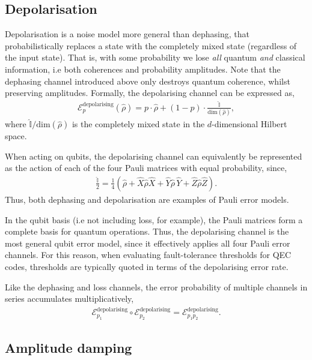 \documentclass[aps,rmp,twocolumn,amsmath,amssymb,nofootinbib,superscriptaddress]{revtex4}
\begin{document}
\subsection{Depolarisation}

Depolarisation is a noise model more general than dephasing, that probabilistically replaces a state with the completely mixed state (regardless of the input state). That is, with some probability we lose \emph{all} quantum \emph{and} classical information, i.e both coherences and probability amplitudes. Note that the dephasing channel introduced above only destroys quantum coherence, whilst preserving amplitudes. Formally, the depolarising channel can be expressed as,
\begin{align} \label{eq:depolarizing_channel}
\mathcal{E}^\mathrm{depolarising}_p(\hat\rho) = p \cdot \hat\rho + (1-p)\cdot \frac{\mathbb{\hat{I}}}{\mathrm{dim}(\hat\rho)},
\end{align}
where $\mathbb{\hat{I}}/\mathrm{dim}(\hat\rho)$ is the completely mixed state in the $d$-dimensional Hilbert space.

When acting on qubits, the depolarising channel can equivalently be represented as the action of each of the four Pauli matrices with equal probability, since,
\begin{align}
\frac{\mathbb{\hat{I}}}{2} = \frac{1}{4}(\hat\rho + \hat{X}\hat\rho\hat{X} + \hat{Y}\hat\rho\,\hat{Y} + \hat{Z}\hat\rho\hat{Z}).
\end{align}
Thus, both dephasing and depolarisation are examples of Pauli error models.

In the qubit basis (i.e not including loss, for example), the Pauli matrices form a complete basis for quantum operations. Thus, the depolarising channel is the most general qubit error model, since it effectively applies all four Pauli error channels. For this reason, when evaluating fault-tolerance thresholds for QEC codes, thresholds are typically quoted in terms of the depolarising error rate.

Like the dephasing and loss channels, the error probability of multiple channels in series accumulates multiplicatively,
\begin{align}
\mathcal{E}_{p_1}^\mathrm{depolarising} \circ \mathcal{E}_{p_2}^\mathrm{depolarising} = \mathcal{E}_{p_1 p_2}^\mathrm{depolarising}.
\end{align}

%
%

\subsection{Amplitude damping}
\end{document}
